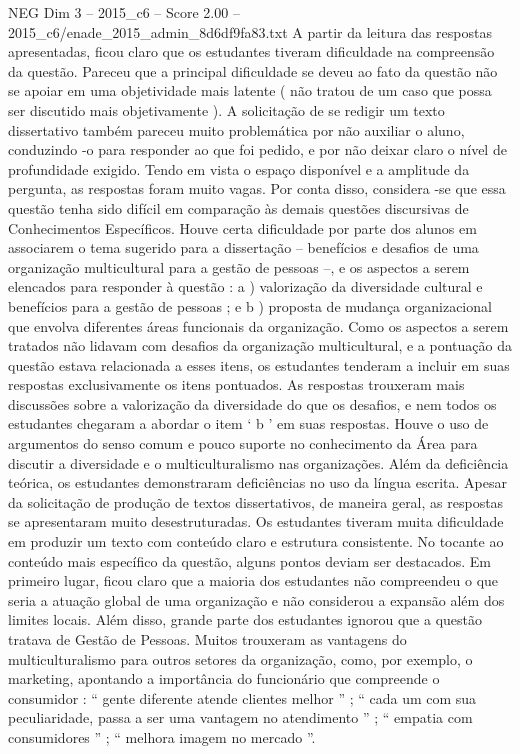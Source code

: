 \begin{textsample}{NEG Dim 3 – 2015\_c6 – Score 2.00 – 2015\_c6/enade\_2015\_admin\_8d6df9fa83.txt}
A partir da leitura das respostas apresentadas, ficou claro que os estudantes tiveram dificuldade na compreensão da questão.
Pareceu que a principal dificuldade se deveu ao fato da questão não se apoiar em uma objetividade mais latente ( não tratou de um caso que possa ser discutido mais objetivamente ).
A solicitação de se redigir um texto dissertativo também pareceu muito problemática por não auxiliar o aluno, conduzindo -o para responder ao que foi pedido, e por não deixar claro o nível de profundidade exigido.
Tendo em vista o espaço disponível e a amplitude da pergunta, as respostas foram muito vagas.
Por conta disso, considera -se que essa questão tenha sido difícil em comparação às demais questões discursivas de Conhecimentos Específicos.
Houve certa dificuldade por parte dos alunos em associarem o tema sugerido para a dissertação – benefícios e desafios de uma organização multicultural para a gestão de pessoas –, e os aspectos a serem elencados para responder à questão : a ) valorização da diversidade cultural e benefícios para a gestão de pessoas ; e b ) proposta de mudança organizacional que envolva diferentes áreas funcionais da organização.
Como os aspectos a serem tratados não lidavam com desafios da organização multicultural, e a pontuação da questão estava relacionada a esses itens, os estudantes tenderam a incluir em suas respostas exclusivamente os itens pontuados.
As respostas trouxeram mais discussões sobre a valorização da diversidade do que os desafios, e nem todos os estudantes chegaram a abordar o item ‘ b ’ em suas respostas.
Houve o uso de argumentos do senso comum e pouco suporte no conhecimento da Área para discutir a diversidade e o multiculturalismo nas organizações.
Além da deficiência teórica, os estudantes demonstraram deficiências no uso da língua escrita.
Apesar da solicitação de produção de textos dissertativos, de maneira geral, as respostas se apresentaram muito desestruturadas.
Os estudantes tiveram muita dificuldade em produzir um texto com conteúdo claro e estrutura consistente.
No tocante ao conteúdo mais específico da questão, alguns pontos deviam ser destacados.
Em primeiro lugar, ficou claro que a maioria dos estudantes não compreendeu o que seria a atuação global de uma organização e não considerou a expansão além dos limites locais.
Além disso, grande parte dos estudantes ignorou que a questão tratava de Gestão de Pessoas.
Muitos trouxeram as vantagens do multiculturalismo para outros setores da organização, como, por exemplo, o marketing, apontando a importância do funcionário que compreende o consumidor : “ gente diferente atende clientes melhor ” ; “ cada um com sua peculiaridade, passa a ser uma vantagem no atendimento ” ; “ empatia com consumidores ” ; “ melhora imagem no mercado ”.

\end{textsample}

